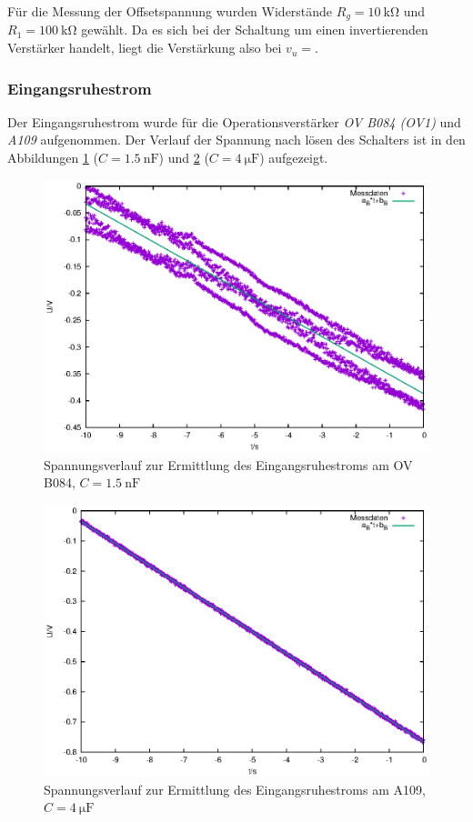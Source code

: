\documentclass[10pt,a4paper]{scrartcl}
\begin{document}
Für die Messung der Offsetspannung wurden Widerstände $R_g=10~\mathrm{k\Omega}$
und $R_1=100~\mathrm{k\Omega}$ gewählt.
Da es sich bei der Schaltung um einen invertierenden Verstärker handelt,
liegt die Verstärkung also bei $v_u=$. %

\subsubsection {Eingangsruhestrom}

Der Eingangsruhestrom wurde für die Operationsverstärker \emph{OV B084 (OV1)}
und \emph{A109} aufgenommen.
Der Verlauf der Spannung nach lösen des Schalters ist in den Abbildungen
\ref{fig:ERS_B} ($C=1.5~\mathrm{nF}$) und
\ref{fig:ERS_A} ($C=4~\mathrm{\mu F}$) aufgezeigt.

\begin{figure}[!ht]
    \includegraphics[width=\textwidth]{graphics/fit_Eingangsruhestrom_OVB084.eps}
    \caption{Spannungsverlauf zur Ermittlung des Eingangsruhestroms am
    OV B084, $C=1.5~\mathrm{nF}$}
    \label{fig:ERS_B}
\end{figure}
\begin{figure}[!ht]
    \includegraphics[width=\textwidth]{graphics/fit_Eingangsruhestrom_A109.eps}
    \caption{Spannungsverlauf zur Ermittlung des Eingangsruhestroms am A109,
    $C=4~\mathrm{\mu F}$}
    \label{fig:ERS_A}
\end{figure}
\end{document}
